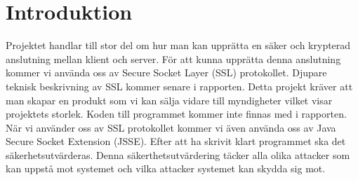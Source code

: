 \section{Introduktion}
Projektet handlar till stor del om hur man kan upprätta en säker och krypterad anslutning mellan klient och server. För att kunna upprätta denna anslutning kommer vi använda oss av Secure Socket Layer (SSL) protokollet. Djupare teknisk beskrivning av SSL kommer senare i rapporten. Detta projekt kräver att man skapar en produkt som vi kan sälja vidare till myndigheter vilket visar projektets storlek. Koden till programmet kommer inte finnas med i rapporten. När vi använder oss av SSL protokollet kommer vi även använda oss av Java Secure Socket Extension (JSSE). Efter att ha skrivit klart programmet ska det säkerhetsutvärderas. Denna säkerthetsutvärdering täcker alla olika attacker som kan uppstå mot systemet och vilka attacker systemet kan skydda sig mot. 